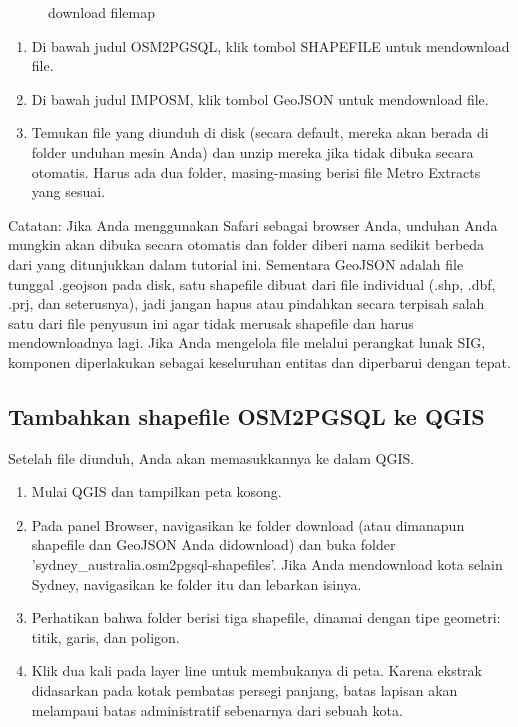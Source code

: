 \begin{figure}[ht]
\caption{download filemap}
\label {downloadfile}
\end{figure}

\begin{enumerate}
\item
Di bawah judul OSM2PGSQL, klik tombol SHAPEFILE untuk mendownload file.
\item
Di bawah judul IMPOSM, klik tombol GeoJSON untuk mendownload file.
\item
Temukan file yang diunduh di disk (secara default, mereka akan berada di folder unduhan mesin Anda) dan unzip mereka jika tidak dibuka secara otomatis. Harus ada dua folder, masing-masing berisi file Metro Extracts yang sesuai.
\end{enumerate}
Catatan: Jika Anda menggunakan Safari sebagai browser Anda, unduhan Anda mungkin akan dibuka secara otomatis dan folder diberi nama sedikit berbeda dari yang ditunjukkan dalam tutorial ini.
Sementara GeoJSON adalah file tunggal .geojson pada disk, satu shapefile dibuat dari file individual (.shp, .dbf, .prj, dan seterusnya), jadi jangan hapus atau pindahkan secara terpisah salah satu dari file penyusun ini agar tidak merusak shapefile dan harus mendownloadnya lagi. Jika Anda mengelola file melalui perangkat lunak SIG, komponen diperlakukan sebagai keseluruhan entitas dan diperbarui dengan tepat.

\subsection{Tambahkan shapefile OSM2PGSQL ke QGIS}
Setelah file diunduh, Anda akan memasukkannya ke dalam QGIS.
\begin{enumerate}
\item
Mulai QGIS dan tampilkan peta kosong.
\item
Pada panel Browser, navigasikan ke folder download (atau dimanapun shapefile dan GeoJSON Anda didownload) dan buka folder 'sydney_australia.osm2pgsql-shapefiles'. Jika Anda mendownload kota selain Sydney, navigasikan ke folder itu dan lebarkan isinya.
\item
Perhatikan bahwa folder berisi tiga shapefile, dinamai dengan tipe geometri: titik, garis, dan poligon.
\item
Klik dua kali pada layer line untuk membukanya di peta. Karena ekstrak didasarkan pada kotak pembatas persegi panjang, batas lapisan akan melampaui batas administratif sebenarnya dari sebuah kota.
\end{enumerate}

